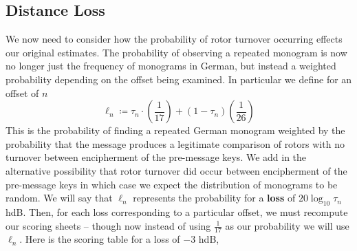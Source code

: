 \subsection{Distance Loss}
We now need to consider how the probability of rotor turnover
occurring effects our original estimates. The probability of
observing a repeated monogram is now no longer just the frequency
of monograms in German, but instead a weighted probability
depending on the offset being examined. In particular we define for
an offset of $n$
\[
  \ell_n \coloneq \tau_n\cdot(\frac{1}{17}) + (1-\tau_n)(\frac{1}{26})
\]
This is the probability of finding a repeated German monogram
weighted by the probability that the message produces a legitimate
comparison of rotors with no turnover between encipherment of the
pre-message keys. We add in the alternative possibility that rotor
turnover did occur between encipherment of the pre-message keys in
which case we expect the distribution of monograms to be random. We
will say that $\ell_n$ represents the probability for a {\bf{loss}}
of $20\log_{10}{\tau_n}$ hdB. Then, for each loss corresponding to
a particular offset, we must recompute our scoring sheets -- though
now instead of using $\frac{1}{17}$ as our probability we will use
$\ell_n$. Here is the scoring table for a loss of $-3$ hdB,
